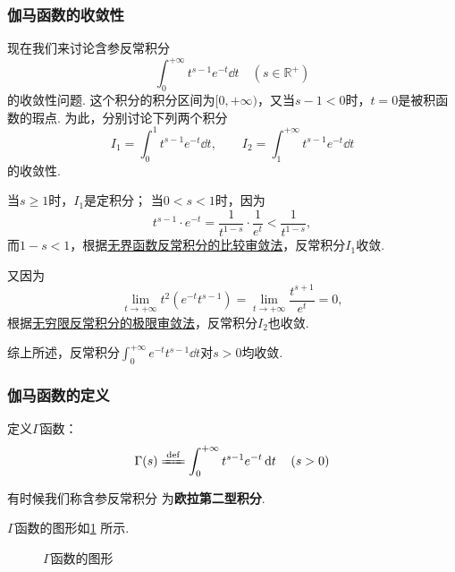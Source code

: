 \subsubsection{伽马函数的收敛性}
现在我们来讨论含参反常积分\[
\int_0^{+\infty} t^{s-1} e^{-t} \dd{t} \quad(s\in\mathbb{R}^+)
\]的收敛性问题.
这个积分的积分区间为\([0,+\infty)\)，又当\(s-1<0\)时，\(t=0\)是被积函数的瑕点.
为此，分别讨论下列两个积分\[
I_1 = \int_0^1 t^{s-1} e^{-t} \dd{t},
\qquad
I_2 = \int_1^{+\infty} t^{s-1} e^{-t} \dd{t}
\]的收敛性.

当\(s \geqslant 1\)时，\(I_1\)是定积分；
当\(0 < s < 1\)时，因为\[
t^{s-1} \cdot e^{-t} = \frac{1}{t^{1-s}} \cdot \frac{1}{e^t} < \frac{1}{t^{1-s}},
\]而\(1-s < 1\)，根据\hyperref[theorem:定积分.无界函数的反常积分的比较审敛法]{无界函数反常积分的比较审敛法}，反常积分\(I_1\)收敛.

又因为\[
\lim\limits_{t\to+\infty} t^2 (e^{-t} t^{s-1})
= \lim\limits_{t\to+\infty} \frac{t^{s+1}}{e^t} = 0,
\]根据\hyperref[theorem:定积分.无穷限反常积分的极限审敛法]{无穷限反常积分的极限审敛法}，反常积分\(I_2\)也收敛.

综上所述，反常积分\(\int_0^{+\infty} e^{-t} t^{s-1} \dd{t}\)对\(s > 0\)均收敛.

\subsubsection{伽马函数的定义}
\begin{definition}
定义\(\Gamma\)函数：
\begin{equation}\label{equation:特殊函数.伽马函数的积分定义}
\Gamma(s)
\defeq
\int_0^{+\infty} t^{s-1} e^{-t} \dd{t}
\quad(s>0)
\end{equation}
\end{definition}
有时候我们称含参反常积分  为\textbf{欧拉第二型积分}.

\(\Gamma\)函数的图形如\cref{figure:定积分.伽马函数} 所示.

\begin{figure}%
\centering
{}
\caption{\(\Gamma\)函数的图形}
\label{figure:定积分.伽马函数}
\end{figure}


